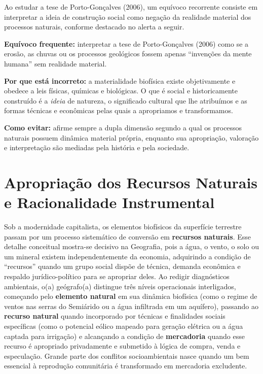 Ao estudar a tese de Porto-Gonçalves (2006), um equívoco recorrente consiste em interpretar a ideia de construção social como negação da realidade material dos processos naturais, conforme destacado no alerta a seguir.

\begin{boxErro}
\textbf{Equívoco frequente:} interpretar a tese de Porto-Gonçalves (2006) como se a erosão, as chuvas ou os processos geológicos fossem apenas ``invenções da mente humana'' sem realidade material.

\textbf{Por que está incorreto:} a materialidade biofísica existe objetivamente e obedece a leis físicas, químicas e biológicas. O que é social e historicamente construído é a \emph{ideia} de natureza, o significado cultural que lhe atribuímos e as formas técnicas e econômicas pelas quais a apropriamos e transformamos.

\textbf{Como evitar:} afirme sempre a dupla dimensão segundo a qual os processos naturais possuem dinâmica material própria, enquanto sua apropriação, valoração e interpretação são mediadas pela história e pela sociedade.
\end{boxErro}

\section{Apropriação dos Recursos Naturais e Racionalidade Instrumental}

Sob a modernidade capitalista, os elementos biofísicos da superfície terrestre passam por um processo sistemático de conversão em \textbf{recursos naturais}. Esse detalhe conceitual mostra-se decisivo na Geografia, pois a água, o vento, o solo ou um mineral existem independentemente da economia, adquirindo a condição de ``recursos'' quando um grupo social dispõe de técnica, demanda econômica e respaldo jurídico-político para se apropriar deles. Ao redigir diagnósticos ambientais, o(a) geógrafo(a) distingue três níveis operacionais interligados, começando pelo \textbf{elemento natural} em sua dinâmica biofísica (como o regime de ventos nas serras do Semiárido ou a água infiltrada em um aquífero), passando ao \textbf{recurso natural} quando incorporado por técnicas e finalidades sociais específicas (como o potencial eólico mapeado para geração elétrica ou a água captada para irrigação) e alcançando a condição de \textbf{mercadoria} quando esse recurso é apropriado privadamente e submetido à lógica de compra, venda e especulação. Grande parte dos conflitos socioambientais nasce quando um bem essencial à reprodução comunitária é transformado em mercadoria excludente.

